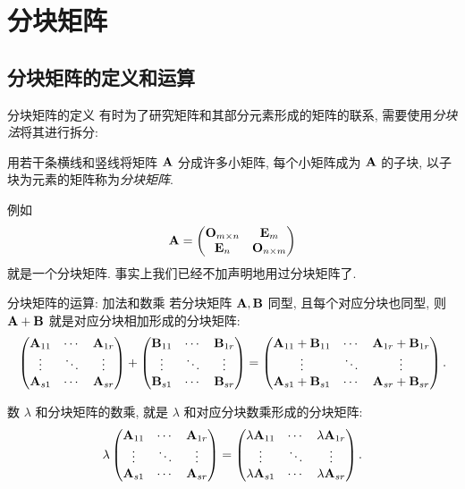 \section{分块矩阵}

\subsection{分块矩阵的定义和运算}

\begin{frame}{分块矩阵的定义}
	\onslide<+->
	有时为了研究矩阵和其部分元素形成的矩阵的联系, 需要使用\emph{分块法}将其进行拆分:
	\onslide<+->
	\begin{definition}
		用若干条横线和竖线将矩阵 ${\mathbf{A}}$ 分成许多小矩阵, 每个小矩阵成为 ${\mathbf{A}}$ 的子块, 以子块为元素的矩阵称为\emph{分块矩阵}.
	\end{definition}
	\onslide<+->
	例如
	\[{\mathbf{A}}=\begin{pmatrix}
		{\mathbf{O}}_{m\times n}&{\mathbf{E}}_m\\
		{\mathbf{E}}_n&{\mathbf{O}}_{n\times m}
	\end{pmatrix}\]
	就是一个分块矩阵.
	\onslide<+->
	事实上我们已经不加声明地用过分块矩阵了.
\end{frame}


\begin{frame}{分块矩阵的运算: 加法和数乘}
	\onslide<+->
	若分块矩阵 ${\mathbf{A}},{\mathbf{B}}$ 同型, 且每个对应分块也同型, 则 ${\mathbf{A}}+{\mathbf{B}}$ 就是对应分块相加形成的分块矩阵:
	\[\begin{pmatrix}
		{\mathbf{A}}_{11}&\cdots&{\mathbf{A}}_{1r}\\
		\vdots&\ddots&\vdots\\
		{\mathbf{A}}_{s1}&\cdots&{\mathbf{A}}_{sr}
	\end{pmatrix}+\begin{pmatrix}
		{\mathbf{B}}_{11}&\cdots&{\mathbf{B}}_{1r}\\
		\vdots&\ddots&\vdots\\
		{\mathbf{B}}_{s1}&\cdots&{\mathbf{B}}_{sr}
	\end{pmatrix}=\begin{pmatrix}
		{\mathbf{A}}_{11}+{\mathbf{B}}_{11}&\cdots&{\mathbf{A}}_{1r}+{\mathbf{B}}_{1r}\\
		\vdots&\ddots&\vdots\\
		{\mathbf{A}}_{s1}+{\mathbf{B}}_{s1}&\cdots&{\mathbf{A}}_{sr}+{\mathbf{B}}_{sr}
	\end{pmatrix}.\]

	\onslide<+->
	数 $\lambda$ 和分块矩阵的数乘, 就是 $\lambda$ 和对应分块数乘形成的分块矩阵:
	\[\lambda\begin{pmatrix}
		{\mathbf{A}}_{11}&\cdots&{\mathbf{A}}_{1r}\\
		\vdots&\ddots&\vdots\\
		{\mathbf{A}}_{s1}&\cdots&{\mathbf{A}}_{sr}
	\end{pmatrix}=\begin{pmatrix}
		\lambda{\mathbf{A}}_{11}&\cdots&\lambda{\mathbf{A}}_{1r}\\
		\vdots&\ddots&\vdots\\
		\lambda{\mathbf{A}}_{s1}&\cdots&\lambda{\mathbf{A}}_{sr}
	\end{pmatrix}.\]
\end{frame}


